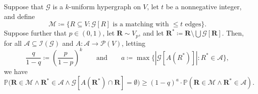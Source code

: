 \documentclass[11pt,a4paper,oneside,reqno]{amsart}
\newcommand{\bM}{\mathbf{M}}
\newcommand{\bR}{\mathbf{R}}
\newcommand{\bRs}{\mathbf{R^*}}
\newcommand{\cA}{\mathcal{A}}
\newcommand{\cG}{\mathcal{G}}
\newcommand{\cI}{\mathcal{I}}
\newcommand{\cM}{\mathcal{M}}
\newcommand{\cP}{\mathcal{P}}
\newcommand{\cS}{\mathcal{S}}
\renewcommand{\Pr}{\mathbb{P}}
\newcommand{\1}{\mathbbm{1}} %
\renewcommand{\le}{\leqslant}
\renewcommand{\ge}{\geqslant}
\begin{document}
\begin{lemma}
  \label{lemma:matching-resample}
  Suppose that $\cG$ is a $k$-uniform hypergraph on $V$, let $t$ be a nonnegative integer, and define
  \[
    \cM \coloneqq \{R \subseteq V : \text{$\cG[R]$ is a matching with $\le t$ edges}\}.
  \]
  Suppose further that $p \in (0,1)$, let $\bR \sim V_p$, and let $\bRs \coloneqq \bR \setminus \bigcup \cG[\bR]$.  Then, for all $\cA \subseteq \cI(\cG)$ and $A \colon \cA \to \cP(V)$, letting
  \[
    \frac{q}{1-q} \coloneqq \left(\frac{p}{1-p}\right)^k
    \qquad
    \text{and}
    \qquad
    a \coloneqq \max\big\{|\cG[A(R^*)]| : R^* \in \cA\big\},
  \]
  we have
  \[
    \Pr\big(\bR \in \cM \wedge \bRs \in \cA \wedge \cG[A(\bRs) \cap \bR] = \emptyset\big) \ge
    (1-q)^{a} \cdot \Pr(\bR \in \cM \wedge \bRs \in \cA).
  \]
\end{lemma}
\end{document}
